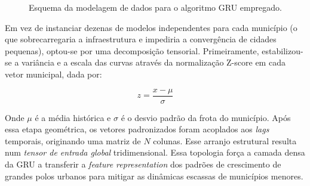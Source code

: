 \documentclass[12pt,a4paper]{article}
\begin{document}
\begin{figure}[!ht]
\centering
{}
\caption{Esquema da modelagem de dados para o algoritmo GRU empregado.}
\label{fig:gru_fluxo}
\end{figure}

Em vez de instanciar dezenas de modelos independentes para cada município (o que sobrecarregaria a infraestrutura e impediria a convergência de cidades pequenas), optou-se por uma decomposição tensorial. Primeiramente, estabilizou-se a variância e a escala das curvas através da normalização Z-score em cada vetor municipal, dada por:

$$z = \frac{x - \mu}{\sigma}$$

Onde $\mu$ é a média histórica e $\sigma$ é o desvio padrão da frota do município. Após essa etapa geométrica, os vetores padronizados foram acoplados aos \textit{lags} temporais, originando uma matriz de $N$ colunas. Esse arranjo estrutural resulta num \textit{tensor de entrada global} tridimensional. Essa topologia força a camada densa da GRU a transferir a \textit{feature representation} dos padrões de crescimento de grandes polos urbanos para mitigar as dinâmicas escassas de municípios menores.
\end{document}
